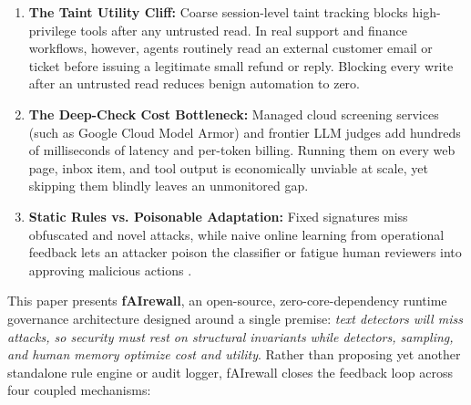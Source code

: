 \documentclass[conference]{IEEEtran}
\begin{document}
\begin{enumerate}
    \item \textbf{The Taint Utility Cliff:} Coarse session-level taint tracking blocks high-privilege tools after any untrusted read. In real support and finance workflows, however, agents routinely read an external customer email or ticket before issuing a legitimate small refund or reply. Blocking every write after an untrusted read reduces benign automation to zero.
    \item \textbf{The Deep-Check Cost Bottleneck:} Managed cloud screening services (such as Google Cloud Model Armor) and frontier LLM judges add hundreds of milliseconds of latency and per-token billing. Running them on every web page, inbox item, and tool output is economically unviable at scale, yet skipping them blindly leaves an unmonitored gap.
    \item \textbf{Static Rules vs. Poisonable Adaptation:} Fixed signatures miss obfuscated and novel attacks, while naive online learning from operational feedback lets an attacker poison the classifier or fatigue human reviewers into approving malicious actions \cite{aljumaily2026untrusted, zhan2025adaptive}.
\end{enumerate}

This paper presents \textbf{fAIrewall}, an open-source, zero-core-dependency runtime governance architecture designed around a single premise: \textit{text detectors will miss attacks, so security must rest on structural invariants while detectors, sampling, and human memory optimize cost and utility}. Rather than proposing yet another standalone rule engine or audit logger, fAIrewall closes the feedback loop across four coupled mechanisms:
\end{document}
